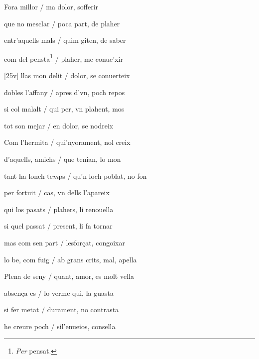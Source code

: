 \begin{estrofa}

 Fora millor / ma dolor, sofferir

 que no mesclar / poca part, de plaher

 entr'aquells mals / quim giten, de saber

 com del pensta\footnote{\textit{Per }pensat.} / plaher, me conue'xir

[25v]
 llas mon delit / dolor, se conuerteix

 dobles l'affany / apres d'vn, poch repos

 si col malalt / qui per, vn plahent, mos

 tot son mejar / en dolor, se nodreix

\end{estrofa}



\begin{estrofa}

 Com l'hermita / qui'nyorament, nol creix

 d'aquells, amichs / que tenian, lo mon

 tant ha lonch te\textit{m}ps / qu'n loch poblat, no fon

 per fortuit / cas, vn dells l'apareix

 qui los pasats / plahers, li renouella

 si quel passat / present, li fa tornar

 mas com sen part / lesfor\c{c}at, congoixar

 lo be, com fuig / ab grans crits, mal, apella

\end{estrofa}


\begin{tornada}

 Plena de seny / quant, amor, es molt vella

 absen\c{c}a es / lo verme qui, la guasta

 si fer metat / durament, no contrasta

 he creure poch / sil'enueios, consella

\end{tornada}




